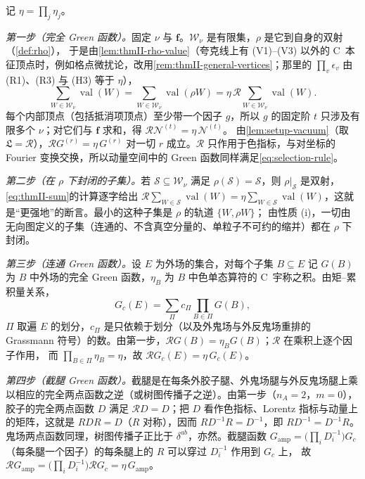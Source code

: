 \documentclass[UTF8,a4paper,11pt,fontset=fandol]{ctexart}
\makeatletter
\theoremstyle{cplain}
\theoremstyle{cdefinition}
\theoremstyle{cremark}
\renewcommand{\proofname}{证明}
\renewenvironment{proof}[1][\proofname]{\par\pushQED{\qed}\normalfont\topsep6\p@\@plus6\p@\relax
  \trivlist\item[\hskip\labelsep\itshape #1\hspace{0.5em}]\ignorespaces}{\popQED\endtrivlist\@endpefalse}
\numberwithin{equation}{section}
\newcommand{\Rop}{\mathcal{R}}                       %
\makeatother
\begin{document}
\begin{proof}
记 $\eta=\prod_j\eta_j$。

\emph{第一步（完全 Green 函数）。}固定 $\nu$ 与 $\boldsymbol f$。$\mathcal W_\nu$ 是有限集，$\rho$ 是它到自身的双射（\cref{def:rho}），
于是由\cref{lem:thmII-rho-value}（夸克线上有 (V1)--(V3) 以外的 C~本征顶点时，例如格点微扰论，改用\cref{rem:thmII-general-vertices}；那里的 $\prod_v\epsilon_v$ 由 (R1)、(R3) 与 (H3) 等于 $\eta$），
\begin{equation}\label{eq:thmII-sum}
\sum_{W\in\mathcal W_\nu}\operatorname{val}(W)=\sum_{W\in\mathcal W_\nu}\operatorname{val}(\rho W)=\eta\,\Rop\sum_{W\in\mathcal W_\nu}\operatorname{val}(W).
\end{equation}
每个内部顶点（包括抵消项顶点）至少带一个因子 $g$，所以 $g$ 的固定阶 $t$ 只涉及有限多个 $\nu$；对它们与 $\boldsymbol f$ 求和，得 $\Rop\mathcal N^{(t)}=\eta\,\mathcal N^{(t)}$。
由\cref{lem:setup-vacuum}（取 $\mathfrak L=\Rop$），$\Rop G^{(r)}=\eta\,G^{(r)}$ 对一切 $r$ 成立。$\Rop$ 只作用于色指标，与对坐标的 Fourier 变换交换，所以动量空间中的 Green 函数同样满足\cref{eq:selection-rule}。

\emph{第二步（在 $\rho$ 下封闭的子集）。}若 $\mathcal S\subseteq\mathcal W_\nu$ 满足 $\rho(\mathcal S)=\mathcal S$，则 $\rho|_{\mathcal S}$ 是双射，\cref{eq:thmII-sum}的计算逐字给出
$\Rop\sum_{W\in\mathcal S}\operatorname{val}(W)=\eta\sum_{W\in\mathcal S}\operatorname{val}(W)$，这就是“更强地”的断言。最小的这种子集是 $\rho$ 的轨道 $\{W,\rho W\}$；
由性质 (i)，一切由无向图定义的子集（连通的、不含真空分量的、单粒子不可约的缩并）都在 $\rho$ 下封闭。

\emph{第三步（连通 Green 函数）。}设 $E$ 为外场的集合，对每个子集 $B\subseteq E$ 记 $G(B)$ 为 $B$ 中外场的完全 Green 函数，$\eta_B$ 为 $B$ 中色单态算符的 C~宇称之积。由矩--累积量关系，
\[
G_c(E)=\sum_{\Pi}c_\Pi\prod_{B\in\Pi}G(B),
\]
$\Pi$ 取遍 $E$ 的划分，$c_\Pi$ 是只依赖于划分（以及外鬼场与外反鬼场重排的 Grassmann 符号）的数。由第一步，$\Rop G(B)=\eta_BG(B)$；$\Rop$ 在乘积上逐个因子作用，
而 $\prod_{B\in\Pi}\eta_B=\eta$，故 $\Rop G_c(E)=\eta\,G_c(E)$。

\emph{第四步（截腿 Green 函数）。}截腿是在每条外胶子腿、外鬼场腿与外反鬼场腿上乘以相应的完全两点函数之逆（或树图传播子之逆）。由第一步（$n_A=2$，$m=0$），
胶子的完全两点函数 $D$ 满足 $\Rop D=D$；把 $D$ 看作色指标、Lorentz 指标与动量上的矩阵，这就是 $RDR=D$（$R$ 对称），因而 $RD^{-1}R=D^{-1}$，即 $RD^{-1}=D^{-1}R$。
鬼场两点函数同理，树图传播子正比于 $\delta^{ab}$，亦然。截腿函数 $G_{\mathrm{amp}}=\bigl(\prod_iD_i^{-1}\bigr)G_c$（每条腿一个因子）的每条腿上的 $R$ 可以穿过 $D_i^{-1}$ 作用到 $G_c$ 上，
故 $\Rop G_{\mathrm{amp}}=\bigl(\prod_iD_i^{-1}\bigr)\Rop G_c=\eta\,G_{\mathrm{amp}}$。


\end{proof}
\end{document}
